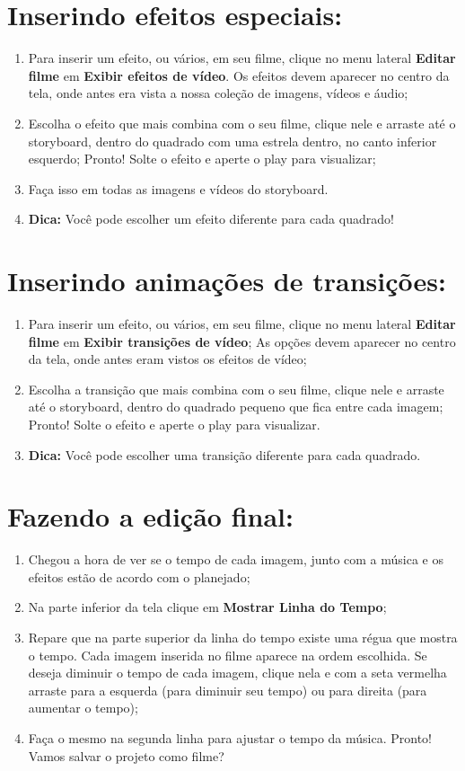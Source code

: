 \documentclass{article}
\begin{document}
\newpage

\section{Inserindo efeitos especiais:}
\begin{enumerate}
\item Para inserir um efeito, ou vários, em seu filme, clique no menu lateral \textbf{Editar filme} em \textbf{Exibir efeitos de vídeo}. Os efeitos devem aparecer no centro da tela, onde antes era vista a nossa coleção de imagens, vídeos e áudio;
\item Escolha o efeito que mais combina com o seu filme, clique nele e arraste até o storyboard, dentro do quadrado com uma estrela dentro, no canto inferior
esquerdo; Pronto! Solte o efeito e aperte o play para visualizar;
\item Faça isso em todas as imagens e vídeos do storyboard. 
\item \textbf{Dica:} Você pode escolher um efeito diferente para cada quadrado!
\end{enumerate}

\section{Inserindo animações de transições:}
\begin{enumerate}
\item Para inserir um efeito, ou vários, em seu filme, clique no menu lateral \textbf{Editar filme} em \textbf{Exibir transições de vídeo}; As opções devem aparecer no centro da tela, onde antes eram vistos os efeitos de vídeo;
\item Escolha a transição que mais combina com o seu filme, clique nele e arraste até o storyboard, dentro do quadrado pequeno que fica entre cada imagem;
Pronto! Solte o efeito e aperte o play para visualizar.
\item \textbf{Dica:} Você pode escolher uma transição diferente para cada quadrado.
\end{enumerate}

\section{Fazendo a edição final:}
\begin{enumerate}
\item Chegou a hora de ver se o tempo de cada imagem, junto com a música e os efeitos estão de acordo com o planejado;
\item Na parte inferior da tela clique em \textbf{Mostrar Linha do Tempo};
\item Repare que na parte superior da linha do tempo existe uma régua que mostra o tempo. Cada imagem inserida no filme aparece na ordem escolhida. Se deseja diminuir o tempo de cada imagem, clique nela e com a seta vermelha arraste para a esquerda (para diminuir seu tempo) ou para direita (para aumentar o tempo);
\item Faça o mesmo na segunda linha para ajustar o tempo da música. Pronto! Vamos salvar o projeto como filme?
\end{enumerate}
\end{document}
